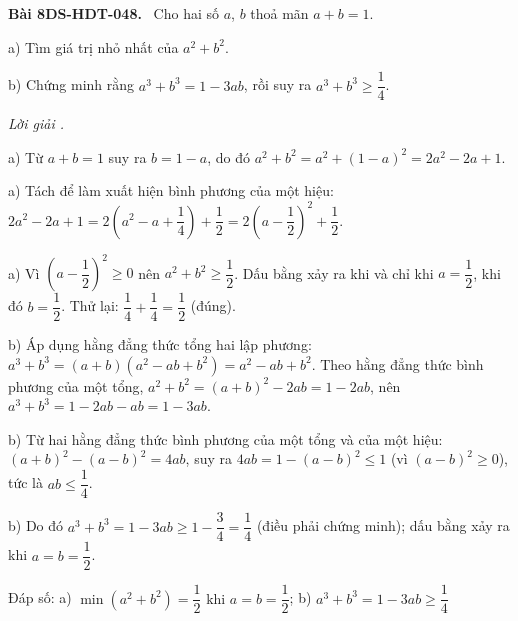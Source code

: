 \documentclass[12pt,a4paper]{article}
\newenvironment{problem}[1][]{\par\medskip\noindent\textbf{Bài #1.}\ }{\par}
\newenvironment{solution}[1][]{\par\noindent\textit{Lời giải #1.}\par}{\par}
\begin{document}
\begin{problem}[8DS-HDT-048]
Cho hai số $a$, $b$ thoả mãn $a + b = 1$.

a) Tìm giá trị nhỏ nhất của $a^2 + b^2$.

b) Chứng minh rằng $a^3 + b^3 = 1 - 3ab$, rồi suy ra $a^3 + b^3 \geq \dfrac{1}{4}$.

\begin{solution}
a) Từ $a + b = 1$ suy ra $b = 1 - a$, do đó $a^2 + b^2 = a^2 + (1 - a)^2 = 2a^2 - 2a + 1$.

a) Tách để làm xuất hiện bình phương của một hiệu: $2a^2 - 2a + 1 = 2\left(a^2 - a + \dfrac{1}{4}\right) + \dfrac{1}{2} = 2\left(a - \dfrac{1}{2}\right)^2 + \dfrac{1}{2}$.

a) Vì $\left(a - \dfrac{1}{2}\right)^2 \geq 0$ nên $a^2 + b^2 \geq \dfrac{1}{2}$. Dấu bằng xảy ra khi và chỉ khi $a = \dfrac{1}{2}$, khi đó $b = \dfrac{1}{2}$. Thử lại: $\dfrac{1}{4} + \dfrac{1}{4} = \dfrac{1}{2}$ (đúng).

b) Áp dụng hằng đẳng thức tổng hai lập phương: $a^3 + b^3 = (a + b)(a^2 - ab + b^2) = a^2 - ab + b^2$. Theo hằng đẳng thức bình phương của một tổng, $a^2 + b^2 = (a + b)^2 - 2ab = 1 - 2ab$, nên $a^3 + b^3 = 1 - 2ab - ab = 1 - 3ab$.

b) Từ hai hằng đẳng thức bình phương của một tổng và của một hiệu: $(a + b)^2 - (a - b)^2 = 4ab$, suy ra $4ab = 1 - (a - b)^2 \leq 1$ (vì $(a - b)^2 \geq 0$), tức là $ab \leq \dfrac{1}{4}$.

b) Do đó $a^3 + b^3 = 1 - 3ab \geq 1 - \dfrac{3}{4} = \dfrac{1}{4}$ (điều phải chứng minh); dấu bằng xảy ra khi $a = b = \dfrac{1}{2}$.

Đáp số: a) $\boxed{\min (a^2 + b^2) = \dfrac{1}{2} \text{ khi } a = b = \dfrac{1}{2}}$; b) $\boxed{a^3 + b^3 = 1 - 3ab \geq \dfrac{1}{4}}$
\end{solution}
\end{problem}
\end{document}
